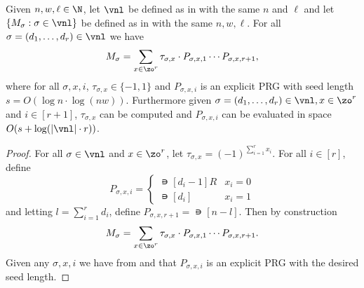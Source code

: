 \begin{corollary}\label{cor:MstructPath}
Given $n,w,\ell \in \N$, let $\vnl$ be defined as in  with the same $n$ and $\ell$ and let $\{M_\sigma:\sigma\in\vnl\}$ be defined as in  with the same $n,w,\ell$. For all $\sigma=(d_1,\dots,d_r)\in \vnl$ we have
\[M_\sigma=\sum_{x\in \zo^r}\tau_{\sigma,x}\cdot P_{\sigma,x,1}\cdots P_{\sigma,x,r+1},\]
where for all $\sigma,x,i$, $\tau_{\sigma,x}\in \{-1,1\}$ and $P_{\sigma,x,i}$ is an explicit PRG with seed length $s=O(\log n\cdot\log (nw))$.
Furthermore given $\sigma=(d_1,\dots,d_r)\in \vnl,x\in \zo^r$ and $i\in [r+1]$, $\tau_{\sigma,x}$ can be computed and $P_{\sigma,x,i}$ can be evaluated in space $O(s+\log(|\vnl|\cdot r))$.
\end{corollary}
\begin{proof}
For all $\sigma\in \vnl$ and $x\in \zo^{r}$, let $\tau_{\sigma,x}=(-1)^{\sum_{i=1}^{r}x_i}$. For all $i\in[r]$, define
\[P_{\sigma,x,i} = \begin{cases}
\nis[d_{i}-1]R & x_i=0\\
\nis[d_{i}] & x_i=1
\end{cases}\]
and letting $l=\sum_{i=1}^rd_i$, define $P_{\sigma,x,r+1}=\nis[n-l]$. Then by construction
\[M_\sigma=\sum_{x\in \zo^r}\tau_{\sigma,x}\cdot P_{\sigma,x,1}\cdots P_{\sigma,x,r+1}.\] 
Given any $\sigma,x,i$ we have from  and  that $P_{\sigma,x,i}$ is an explicit PRG with the desired seed length.
\end{proof}

